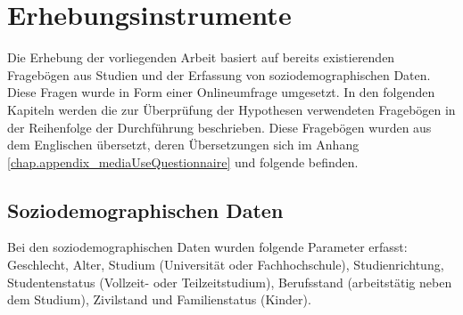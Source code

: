 \section{Erhebungsinstrumente}\label{section.erhebungsinstrumente}
Die Erhebung der vorliegenden Arbeit basiert auf bereits existierenden Fragebögen aus Studien und der Erfassung von soziodemographischen Daten. Diese Fragen wurde in Form einer Onlineumfrage umgesetzt. In den folgenden Kapiteln werden die zur Überprüfung der Hypothesen verwendeten Fragebögen in der Reihenfolge der Durchführung beschrieben. Diese Fragebögen wurden aus dem Englischen übersetzt, deren Übersetzungen sich im Anhang \ref{chap.appendix_mediaUseQuestionnaire} und folgende befinden.

\subsection{Soziodemographischen Daten}\label{subsection.soziDaten}
Bei den soziodemographischen Daten wurden folgende Parameter erfasst: Geschlecht, Alter, Studium (Universität oder Fachhochschule), Studienrichtung, Studentenstatus (Vollzeit- oder Teilzeitstudium), Berufsstand (arbeitstätig neben dem Studium), Zivilstand und Familienstatus (Kinder). \\

